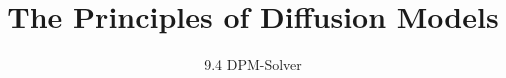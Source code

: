 
\title{The Principles of Diffusion Models}
\subtitle{9.4 DPM-Solver}


\begin{frame}
    \titlepage
\end{frame}



